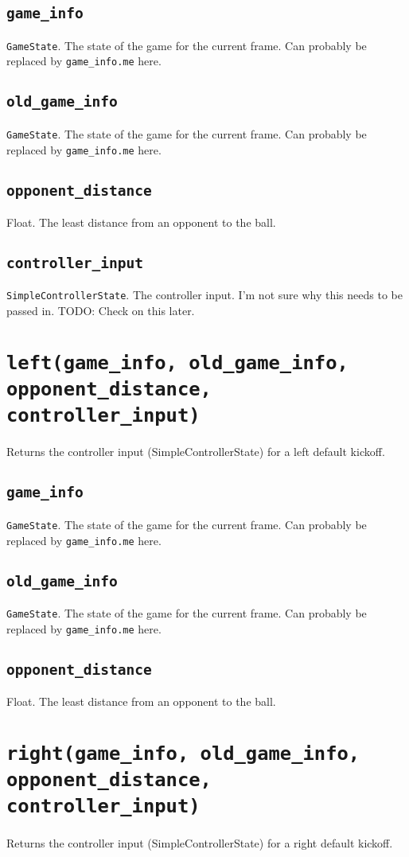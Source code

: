 \documentclass{article}
\newcommand{\function}[1]{\section{\texttt{#1}}}
\newcommand{\argumenta}[1]{\subsection{\texttt{#1}}}
\begin{document}
\begin{flushleft}
{           \argumenta{game\_info}
                     {
                       \texttt{GameState}.  The state of the game for the current frame.  Can probably be replaced by \texttt{game\_info.me} here.
                     }
           \argumenta{old\_game\_info}
                     {
                       \texttt{GameState}.  The state of the game for the current frame.  Can probably be replaced by \texttt{game\_info.me} here.
                     }
           \argumenta{opponent\_distance}
                     {
                       Float.  The least distance from an opponent to the ball.
                     }
           \argumenta{controller\_input}
                     {
                       \texttt{SimpleControllerState}.  The controller input.  I'm not sure why this needs to be passed in.  TODO: Check on this later.
                     }
         }


\function{left(game\_info, old\_game\_info, opponent\_distance, controller\_input)}
         {
           Returns the controller input (SimpleControllerState) for a left default kickoff.

           \argumenta{game\_info}
                     {
                       \texttt{GameState}.  The state of the game for the current frame.  Can probably be replaced by \texttt{game\_info.me} here.
                     }
           \argumenta{old\_game\_info}
                     {
                       \texttt{GameState}.  The state of the game for the current frame.  Can probably be replaced by \texttt{game\_info.me} here.
                     }
           \argumenta{opponent\_distance}
                     {
                       Float.  The least distance from an opponent to the ball.
                     }
         }

\function{right(game\_info, old\_game\_info, opponent\_distance, controller\_input)}
         {
           Returns the controller input (SimpleControllerState) for a right default kickoff.

}
\end{flushleft}
\end{document}
